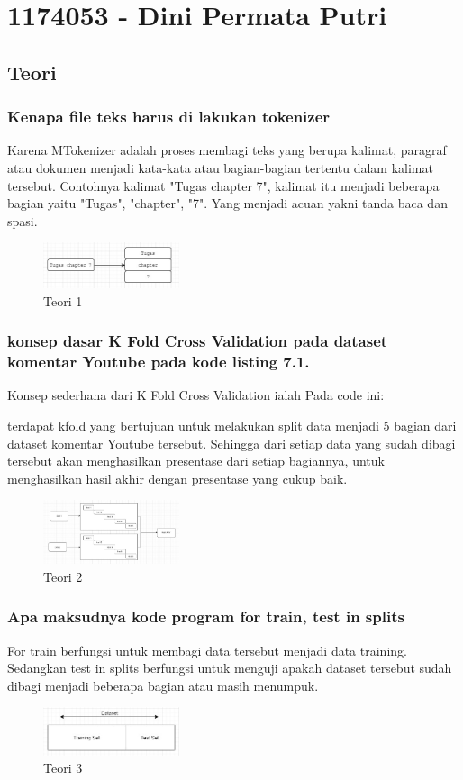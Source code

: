 \section{1174053 - Dini Permata Putri}
\subsection{Teori}
\subsubsection{Kenapa file teks harus di lakukan tokenizer}
\hfill\break
Karena MTokenizer adalah proses membagi teks yang berupa kalimat, paragraf atau dokumen menjadi kata-kata atau bagian-bagian tertentu dalam kalimat tersebut. Contohnya kalimat "Tugas chapter 7", kalimat itu menjadi beberapa bagian yaitu "Tugas", "chapter", "7". Yang menjadi acuan yakni tanda baca dan spasi.
\begin{figure}[H]
\centering
	\includegraphics[width=4cm]{figures/1174053/7/1.jpg}
\caption{Teori 1}
\end{figure}

\subsubsection{konsep dasar K Fold Cross Validation pada dataset komentar Youtube pada kode listing 7.1.}
\hfill\break
Konsep sederhana dari K Fold Cross Validation ialah Pada code ini:

terdapat kfold yang bertujuan untuk melakukan split data menjadi 5 bagian dari dataset komentar Youtube tersebut. Sehingga dari setiap data yang sudah dibagi tersebut akan menghasilkan presentase dari setiap bagiannya, untuk menghasilkan hasil akhir dengan presentase yang cukup baik.
\begin{figure}[H]
\centering
	\includegraphics[width=4cm]{figures/1174053/7/2.jpg}
\caption{Teori 2}
\end{figure}

\subsubsection{Apa maksudnya kode program for train, test in splits}
\hfill\break
For train berfungsi untuk membagi data tersebut menjadi data training. Sedangkan test in splits berfungsi untuk menguji apakah dataset tersebut sudah dibagi menjadi beberapa bagian atau masih menumpuk.
\begin{figure}[H]
\centering
	\includegraphics[width=4cm]{figures/1174053/7/3.jpg}
\caption{Teori 3}
\end{figure}

